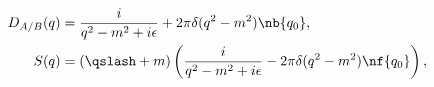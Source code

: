 \begin{equation}
\begin{split}
D_{A/B}(q)&=\dfrac{i}{q^2-m^2+i\epsilon}+2\pi\delta(q^2-m^2)\nb{q_0},\\
S(q)&=\left(\qslash+m\right)\left(\dfrac{i}{q^2-m^2+i\epsilon}
-2\pi\delta(q^2-m^2)\nf{q_0}\right),
\end{split}
\end{equation}

